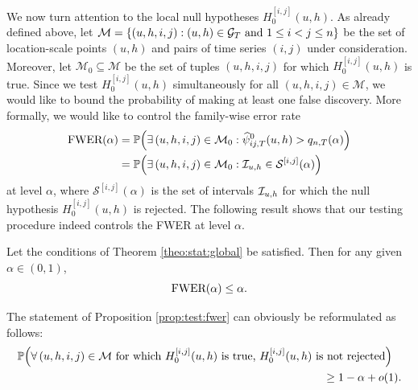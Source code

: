 \documentclass[a4paper,12pt]{article}
\begin{document}

We now turn attention to the local null hypotheses $H_0^{[i, j]}(u, h)$. As already defined above, let $\mathcal{M} = \{ (u,h,i,j): (u,h) \in \mathcal{G}_T \text{ and } 1 \le i < j \le n \}$ be the set of location-scale points $(u,h)$ and pairs of time series $(i,j)$ under consideration. Moreover, let $\mathcal{M}_0 \subseteq \mathcal{M}$ be the set of tuples $(u,h,i,j)$ for which $H_0^{[i, j]}(u, h)$ is true. Since we test $H_0^{[i, j]}(u, h)$ simultaneously for all $(u,h,i,j) \in \mathcal{M}$, we would like to bound the probability of making at least one false discovery. More formally, we would like to control the family-wise error rate 
\begin{align*} 
\text{FWER}(\alpha) 
 & = \mathbb{P} \Big(\exists \,  (u,h,i,j) \in \mathcal{M}_0: \widehat{\psi}^0_{ij, T}(u, h) > q_{n,T}(\alpha) \Big) \\
 & = \mathbb{P} \Big(\exists \,  (u,h,i,j) \in \mathcal{M}_0: \mathcal{I}_{u, h} \in \mathcal{S}^{[i, j]}(\alpha) \Big)
\end{align*}
at level $\alpha$, where $\mathcal{S}^{[i, j]}(\alpha)$ is the set of intervals $\mathcal{I}_{u, h}$ for which the null hypothesis $H_0^{[i, j]}(u, h)$ is rejected. The following result shows that our testing procedure indeed controls the FWER at level $\alpha$.
\begin{prop}\label{prop:test:fwer}
Let the conditions of Theorem \ref{theo:stat:global} be satisfied. Then for any given $\alpha \in (0,1)$, 
\[ \textnormal{FWER}(\alpha) \leq \alpha. \]
\end{prop}
The statement of Proposition \ref{prop:test:fwer} can obviously be reformulated as follows: 
\begin{align*}
\mathbb{P}\Big( \forall \, (u,h,i,j) \in \mathcal{M} \text{ for which } H_0^{[i, j]}(u, h) \text{ is true, } H_0^{[i, j]}(u, h) & \text{ is not rejected} \Big) \\ & \quad \ge 1 - \alpha + o(1).
\end{align*}
\end{document}
